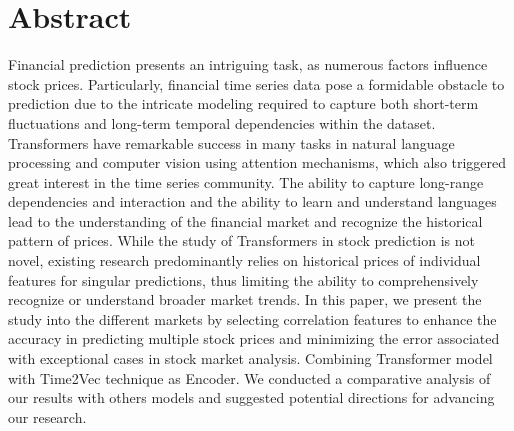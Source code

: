 \chapter*{Abstract}
\label{ch:abstract}

Financial prediction presents an intriguing task, as numerous factors influence stock prices. Particularly, financial time series data pose a formidable obstacle to prediction due to the intricate modeling required to capture both short-term fluctuations and long-term temporal dependencies within the dataset.
Transformers have remarkable success in many tasks in natural language processing and computer vision using attention mechanisms, which also triggered great interest in the time series community. The ability to capture long-range dependencies and interaction and the ability to learn and understand languages lead to the understanding of the financial market and recognize the historical pattern of prices. While the study of Transformers in stock prediction is not novel, existing research predominantly relies on historical prices of individual features for singular predictions, thus limiting the ability to comprehensively recognize or understand broader market trends.
In this paper, we present the study into the different markets by selecting correlation features to enhance the accuracy in predicting multiple stock prices and minimizing the error associated with exceptional cases in stock market analysis. Combining Transformer model with Time2Vec technique as Encoder. We conducted a comparative analysis of our results with others models and suggested potential directions for advancing our research.

